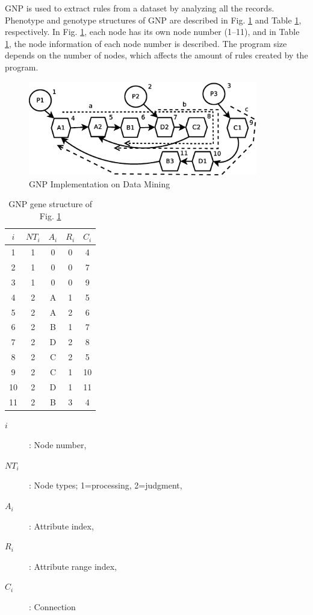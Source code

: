 \documentclass{elsart}
\begin{document}
GNP is used to extract rules from a dataset by analyzing all the records. Phenotype and genotype structures of GNP are described in Fig. \ref{gnpdatamining} and Table \ref{gnp-gene-structure}, respectively. In Fig. \ref{gnpdatamining}, each node has its own node number (1--11), and in Table \ref{gnp-gene-structure}, the node information of each node number is described. The program size depends on the number of nodes, which affects the amount of rules created by the program. 

\begin{figure}[tb]
\begin{center}
\includegraphics[width=10cm]{images/gnpdatamining}
\caption{\label{gnpdatamining} GNP Implementation on Data Mining}
\end{center}
\end{figure}

\begin{table}[tb]
\begin{minipage}[b]{0.4\linewidth}\centering
\caption{\label{gnp-gene-structure}GNP gene structure of Fig. \ref{gnpdatamining}}
\begin{flushleft}
\begin{tabular}{|c|c|c|c|c|}
\hline 
$i$ & $NT_{i}$ & $A_{i}$ & $R_{i}$ & $C_{i}$\tabularnewline
\hline 
1 & 1 & 0 & 0 & 4\tabularnewline
\hline 
2 & 1 & 0 & 0 & 7\tabularnewline
\hline 
3 & 1 & 0 & 0 & 9\tabularnewline
\hline 
4 & 2 & A & 1 & 5\tabularnewline
\hline 
5 & 2 & A & 2 & 6\tabularnewline
\hline 
6 & 2 & B & 1 & 7\tabularnewline
\hline 
7 & 2 & D & 2 & 8\tabularnewline
\hline 
8 & 2 & C & 2 & 5\tabularnewline
\hline 
9 & 2 & C & 1 & 10\tabularnewline
\hline 
10 & 2 & D & 1 & 11\tabularnewline
\hline 
11 & 2 & B & 3 & 4\tabularnewline
\hline 
\end{tabular}
\end{flushleft}
\end{minipage}
\begin{minipage}[b]{0.6\linewidth}
\begin{description}
\item [$i$] : Node number, 
\item [$NT_{i}$] : Node types; 1=processing, 2=judgment, 
\item [$A_{i}$] : Attribute index, 
\item [$R_{i}$] : Attribute range index, 
\item [$C_{i}$] : Connection
\end{description}
\end{minipage}
\end{table}
\end{document}
